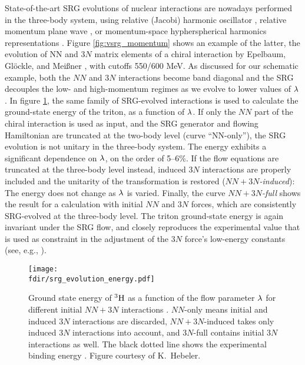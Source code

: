 State-of-the-art SRG evolutions of nuclear interactions are nowadays performed in 
the three-body system, using relative (Jacobi) harmonic oscillator
\cite{Jurgenson:2009bs,Jurgenson:2011zr,Jurgenson:2013fk}, relative momentum plane
wave \cite{Hebeler:2012ly}, or momentum-space hypherspherical harmonics representations 
\cite{Wendt:2013uq}.
Figure \ref{fig:vsrg_momentum} shows an example of the latter, the evolution of 
NN and $3N$ matrix elements of a chiral \NNLO{} interaction by Epelbaum, Gl\"ockle,
and Mei\ss{}ner \cite{Epelbaum:2002nr,Epelbaum:2006mo}, with cutoffs 550/600 MeV. As discussed for our 
schematic example, both the $NN$ and $3N$ interactions become band diagonal and the SRG 
decouples the low- and high-momentum regimes as we evolve to lower values of $\lambdaSRG$. 
In figure \ref{fig:triton}, the same family 
of SRG-evolved interactions is used to calculate the ground-state energy of the triton,
as a function of $\lambdaSRG$. If only the $NN$ part of the chiral interaction is used as 
input, and the SRG generator and flowing Hamiltonian are truncated at the two-body level 
(curve ``NN-only''), the SRG evolution is not unitary in the three-body system. The 
energy exhibits a significant dependence on $\lambdaSRG$, on the order of 5--6\%. If the 
flow equations are truncated at the three-body level instead, induced $3N$ interactions are
properly included and the unitarity of the transformation is restored (\emph{$NN\!+\!3N$-induced}): 
The energy does not change as $\lambdaSRG$ is varied. Finally, the curve \emph{$NN\!+\!3N$-full} 
shows the result for a calculation with initial $NN$ and $3N$ forces, which are consistently 
SRG-evolved at the three-body level. The triton ground-state energy is again invariant 
under the SRG flow, and closely reproduces the experimental value that is used as 
constraint in the adjustment of the $3N$ force's low-energy constants (see, e.g., 
\cite{Epelbaum:2009ve,Machleidt:2011bh,Gazit:2009qf}).


\begin{figure*}[t]
  \setlength{\unitlength}{\textwidth}
  \begin{center}
    \texttt{[image: \\fdir/srg\_evolution\_energy.pdf]}
  \end{center}  
  \caption{\label{fig:triton}Ground state energy of $\nuc{H}{3}$ as a function 
  of the flow parameter $\lambdaSRG$ for different initial \NNLO{} $NN\!+\!3N$ interactions
  \cite{Epelbaum:2002nr,Epelbaum:2006mo}. $NN$-only means initial and 
  induced $3N$ interactions are discarded, $NN\!+\!3N$-induced takes only 
  induced $3N$ interactions into account, and $3N$-full contains initial
  $3N$ interactions as well. The black dotted line shows the experimental 
  binding energy \cite{Wang:2012uq}. Figure courtesy of K.~Hebeler.}
\end{figure*}

